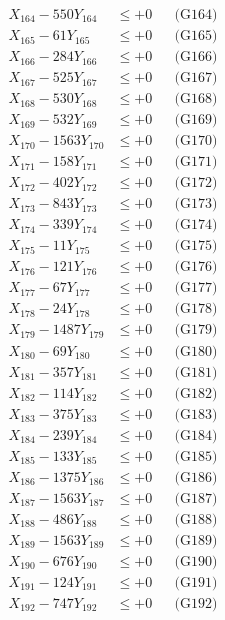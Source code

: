\documentclass[a4paper,10pt]{article}
\begin{document}
{\begin{align}
X_{164} - 550Y_{164} &\leq +0 && \text{(G164)} \\
X_{165} - 61Y_{165} &\leq +0 && \text{(G165)} \\
X_{166} - 284Y_{166} &\leq +0 && \text{(G166)} \\
X_{167} - 525Y_{167} &\leq +0 && \text{(G167)} \\
X_{168} - 530Y_{168} &\leq +0 && \text{(G168)} \\
X_{169} - 532Y_{169} &\leq +0 && \text{(G169)} \\
X_{170} - 1563Y_{170} &\leq +0 && \text{(G170)} \\
\allowbreak
X_{171} - 158Y_{171} &\leq +0 && \text{(G171)} \\
X_{172} - 402Y_{172} &\leq +0 && \text{(G172)} \\
X_{173} - 843Y_{173} &\leq +0 && \text{(G173)} \\
X_{174} - 339Y_{174} &\leq +0 && \text{(G174)} \\
X_{175} - 11Y_{175} &\leq +0 && \text{(G175)} \\
X_{176} - 121Y_{176} &\leq +0 && \text{(G176)} \\
X_{177} - 67Y_{177} &\leq +0 && \text{(G177)} \\
X_{178} - 24Y_{178} &\leq +0 && \text{(G178)} \\
X_{179} - 1487Y_{179} &\leq +0 && \text{(G179)} \\
X_{180} - 69Y_{180} &\leq +0 && \text{(G180)} \\
\allowbreak
X_{181} - 357Y_{181} &\leq +0 && \text{(G181)} \\
X_{182} - 114Y_{182} &\leq +0 && \text{(G182)} \\
X_{183} - 375Y_{183} &\leq +0 && \text{(G183)} \\
X_{184} - 239Y_{184} &\leq +0 && \text{(G184)} \\
X_{185} - 133Y_{185} &\leq +0 && \text{(G185)} \\
X_{186} - 1375Y_{186} &\leq +0 && \text{(G186)} \\
X_{187} - 1563Y_{187} &\leq +0 && \text{(G187)} \\
X_{188} - 486Y_{188} &\leq +0 && \text{(G188)} \\
X_{189} - 1563Y_{189} &\leq +0 && \text{(G189)} \\
X_{190} - 676Y_{190} &\leq +0 && \text{(G190)} \\
\allowbreak
X_{191} - 124Y_{191} &\leq +0 && \text{(G191)} \\
X_{192} - 747Y_{192} &\leq +0 && \text{(G192)} \\

\end{align}}
\end{document}

